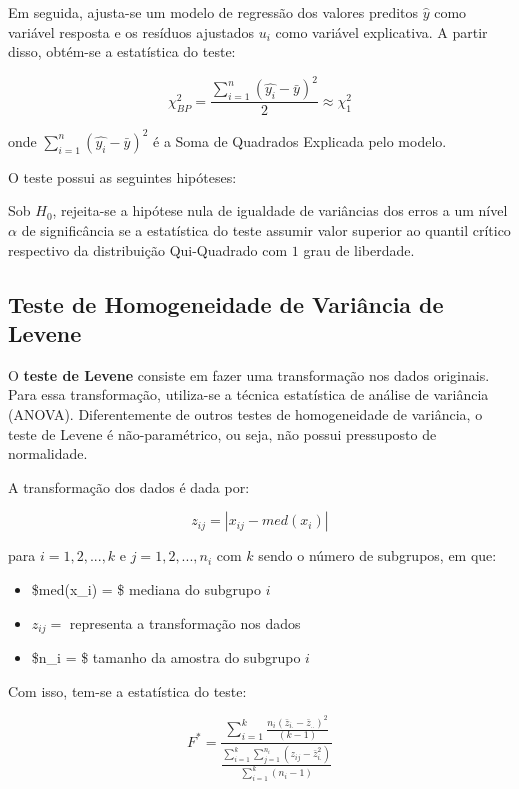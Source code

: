 \documentclass[
  portuguese,
]{estat/estat}
\providecommand{\tightlist}{%
  \setlength{\itemsep}{0pt}\setlength{\parskip}{0pt}}
\begin{document}
Em seguida, ajusta-se um modelo de regressão dos valores preditos
\(\hat{y}\) como variável resposta e os resíduos ajustados \(u_i\) como
variável explicativa. A partir disso, obtém-se a estatística do teste:

\[ \chi^2_{BP} = \frac{\displaystyle \sum^n_{i=1}\left(\hat{y_i} - \bar{y}\right)^2}{2} \approx \chi^2_{1} \]

onde \(\displaystyle \sum^n_{i=1}\left(\hat{y_i} - \bar{y}\right)^2\) é
a Soma de Quadrados Explicada pelo modelo.

O teste possui as seguintes hipóteses:


Sob \(H_0\), rejeita-se a hipótese nula de igualdade de variâncias dos
erros a um nível \(\alpha\) de significância se a estatística do teste
assumir valor superior ao quantil crítico respectivo da distribuição
Qui-Quadrado com \(1\) grau de liberdade.

\subsection{Teste de Homogeneidade de Variância de
Levene}\label{teste-de-homogeneidade-de-variuxe2ncia-de-levene}

O \textbf{teste de Levene} consiste em fazer uma transformação nos dados
originais. Para essa transformação, utiliza-se a técnica estatística de
análise de variância (ANOVA). Diferentemente de outros testes de
homogeneidade de variância, o teste de Levene é não-paramétrico, ou
seja, não possui pressuposto de normalidade.

A transformação dos dados é dada por:

\[ z_{ij} = |x_{ij} - med(x_i)| \]

para \(i=1,2,...,k\) e \(j=1,2,...,n_i\) com \(k\) sendo o número de
subgrupos, em que:

\begin{itemize}
\tightlist
\item
  \$med(x\_i) = \$ mediana do subgrupo \(i\)
\item
  \(z_{ij} =\) representa a transformação nos dados
\item
  \$n\_i = \$ tamanho da amostra do subgrupo \(i\)
\end{itemize}

Com isso, tem-se a estatística do teste:

\begin{equation}
F^* = \frac{\displaystyle \sum_{i=1}^{k}\frac{n_i(\bar{z}_{i.} - \bar{z}_{..})^2}{(k-1)}}{\frac{\displaystyle \sum_{i=1}^{k}\displaystyle \sum_{j=1}^{n_i}(z_{ij}-\bar{z}_{i.}^2)}{\displaystyle \sum_{i=1}^{k}(n_i-1)}} \nonumber
\end{equation}
\end{document}
